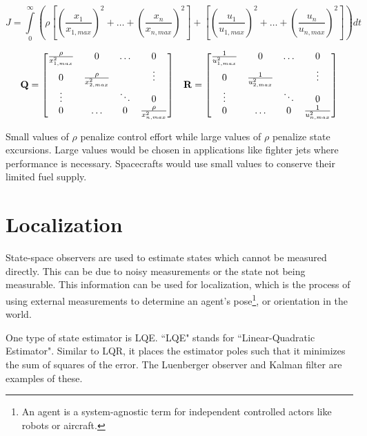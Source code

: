 \begin{equation*}
  J = \int\limits_0^\infty \left(\rho \left[
    \left(\frac{x_1}{x_{1,max}}\right)^2 + \ldots +
    \left(\frac{x_n}{x_{n,max}}\right)^2\right] + \left[
    \left(\frac{u_1}{u_{1,max}}\right)^2 + \ldots +
    \left(\frac{u_n}{u_{n,max}}\right)^2\right]\right) dt
\end{equation*}

\begin{equation*}
  \begin{array}{cc}
    \mathbf{Q} = \begin{bmatrix}
      \frac{\rho}{x_{1,max}^2} & 0 & \ldots & 0 \\
      0 & \frac{\rho}{x_{2,max}^2} & & \vdots \\
      \vdots & & \ddots & 0 \\
      0 & \ldots & 0 & \frac{\rho}{x_{n,max}^2}
    \end{bmatrix} &
    \mathbf{R} = \begin{bmatrix}
      \frac{1}{u_{1,max}^2} & 0 & \ldots & 0 \\
      0 & \frac{1}{u_{2,max}^2} & & \vdots \\
      \vdots & & \ddots & 0 \\
      0 & \ldots & 0 & \frac{1}{u_{n,max}^2}
    \end{bmatrix}
  \end{array}
\end{equation*}

Small values of $\rho$ penalize control effort while large values of $\rho$
penalize \gls{state} excursions. Large values would be chosen in applications
like fighter jets where performance is necessary. Spacecrafts would use small
values to conserve their limited fuel supply.

\section{Localization}

State-space observers are used to estimate \glspl{state} which cannot be
measured directly. This can be due to noisy measurements or the state not being
measurable. This information can be used for \gls{localization}, which is the
process of using external measurements to determine an \gls{agent}'s
pose\footnote{An agent is a system-agnostic term for independent controlled
actors like robots or aircraft.}, or orientation in the world.

One type of state estimator is LQE. ``LQE" stands for ``Linear-Quadratic
Estimator". Similar to LQR, it places the estimator poles such that it minimizes
the sum of squares of the error. The Luenberger observer and Kalman filter are
examples of these.

